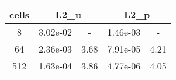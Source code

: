 \documentclass[10pt]{report}
\begin{document}
\begin{table}[H]
\begin{center}
\begin{tabular}{|c|c|c|c|c|} \hline
cells & 
\multicolumn{2}{|c|}{L2_u} & 
\multicolumn{2}{|c|}{L2_p}\\ \hline
8 & 3.02e-02 & - & 1.46e-03 & -\\ \hline
64 & 2.36e-03 & 3.68 & 7.91e-05 & 4.21\\ \hline
512 & 1.63e-04 & 3.86 & 4.77e-06 & 4.05\\ \hline
\end{tabular}
\end{center}
\end{table}
\end{document}
